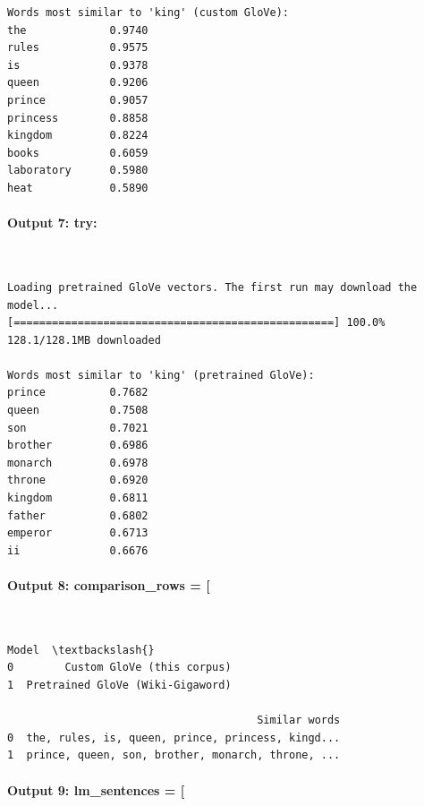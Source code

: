 \documentclass[12pt,a4paper,oneside]{report}
\begin{document}
\begin{Verbatim}[commandchars=\\\{\},breaklines=true,breakanywhere=true,fontsize=\scriptsize,frame=leftline,framesep=2mm,rulecolor=\color{gray}]
Words most similar to 'king' (custom GloVe):
the             0.9740
rules           0.9575
is              0.9378
queen           0.9206
prince          0.9057
princess        0.8858
kingdom         0.8224
books           0.6059
laboratory      0.5980
heat            0.5890
\end{Verbatim}
\paragraph{Output 7: try:}\mbox{}\\[-1ex]
\begin{Verbatim}[commandchars=\\\{\},breaklines=true,breakanywhere=true,fontsize=\scriptsize,frame=leftline,framesep=2mm,rulecolor=\color{gray}]
Loading pretrained GloVe vectors. The first run may download the model...
[==================================================] 100.0% 128.1/128.1MB downloaded

Words most similar to 'king' (pretrained GloVe):
prince          0.7682
queen           0.7508
son             0.7021
brother         0.6986
monarch         0.6978
throne          0.6920
kingdom         0.6811
father          0.6802
emperor         0.6713
ii              0.6676
\end{Verbatim}
\paragraph{Output 8: comparison\_rows = [}\mbox{}\\[-1ex]
\begin{Verbatim}[commandchars=\\\{\},breaklines=true,breakanywhere=true,fontsize=\scriptsize,frame=leftline,framesep=2mm,rulecolor=\color{gray}]
                              Model  \textbackslash{}
0        Custom GloVe (this corpus)
1  Pretrained GloVe (Wiki-Gigaword)

                                       Similar words
0  the, rules, is, queen, prince, princess, kingd...
1  prince, queen, son, brother, monarch, throne, ...
\end{Verbatim}
\paragraph{Output 9: lm\_sentences = [}\mbox{}\\[-1ex]
\end{document}
